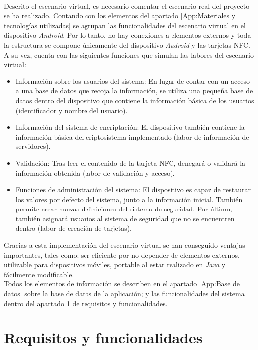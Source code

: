\documentclass[../PFC.tex]{subfiles}
\begin{document}
\*
\vspace{0.5515cm}
\\
Descrito el escenario virtual, es necesario comentar el escenario real del proyecto se ha realizado. Contando con los elementos del apartado \ref{App:Materiales y tecnologías utilizadas} se agrupan las funcionalidades del escenario virtual en el dispositivo \textit{Android}. Por lo tanto, no hay conexiones a elementos externos y toda la estructura se compone únicamente del dispositivo \textit{Android} y las tarjetas NFC. A su vez, cuenta con las siguientes funciones que simulan las labores del escenario virtual:

\begin{itemize}
\item{Información sobre los usuarios del sistema: En lugar de contar con un acceso a una base de datos que recoja la información, se utiliza una pequeña base de datos dentro del dispositivo que contiene la información básica de los usuarios (identificador y nombre del usuario).}
\item{Información del sistema de encriptación: El dispositivo también contiene la información básica del criptosistema implementado (labor de información de servidores).}
\item{Validación: Tras leer el contenido de la tarjeta NFC, denegará o validará la información obtenida (labor de validación y acceso).}
\item{Funciones de administración del sistema: El dispositivo es capaz de restaurar los valores por defecto del sistema, junto a la información inicial. También permite crear nuevas definiciones del sistema de seguridad. Por último, también asignará usuarios al sistema de seguridad que no se encuentren dentro (labor de creación de tarjetas).}
\end{itemize}

Gracias a esta implementación del escenario virtual se han conseguido ventajas importantes, tales como: ser eficiente por no depender de elementos externos, utilizable para dispositivos móviles, portable al estar realizado en \textit{Java} y fácilmente modificable.
\*
\vspace{0.5515cm}
\\
Todos los elementos de información se describen en el apartado \ref{App:Base de datos} sobre la base de datos de la aplicación; y las funcionalidades del sistema dentro del apartado \ref{App:Requisitos y funcionalidades} de requisitos y funcionalidades.

\section{Requisitos y funcionalidades}
\label{App:Requisitos y funcionalidades}
\end{document}
